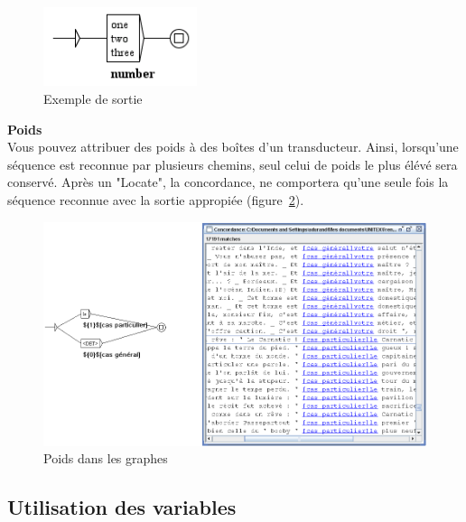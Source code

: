 \begin{figure}[h]
\begin{center}
\includegraphics[width=4.5cm]{resources/img/fig5-15.png}
\caption{Exemple de sortie\label{fig-exemple-transduction}}
\end{center}
\end{figure}


\noindent \textbf{Poids}\\


Vous pouvez attribuer des poids à des boîtes d'un transducteur. Ainsi, lorsqu'une séquence est
reconnue par plusieurs chemins, seul celui de poids le plus élévé sera conservé.
Après un "Locate", la concordance, ne comportera qu'une seule fois la séquence reconnue avec la
sortie appropiée (figure~\ref{fig-weights-in-graphs}).

\bigskip
\begin{figure}[h!]
\begin{center}
\includegraphics[width=14.5cm]{resources/img/fig5-15b.png}
\caption{Poids dans les graphes \label{fig-weights-in-graphs}}
\end{center}
\end{figure}


\subsection{Utilisation des variables}
\label{section-using-variables}
\index{\verb+$+}

